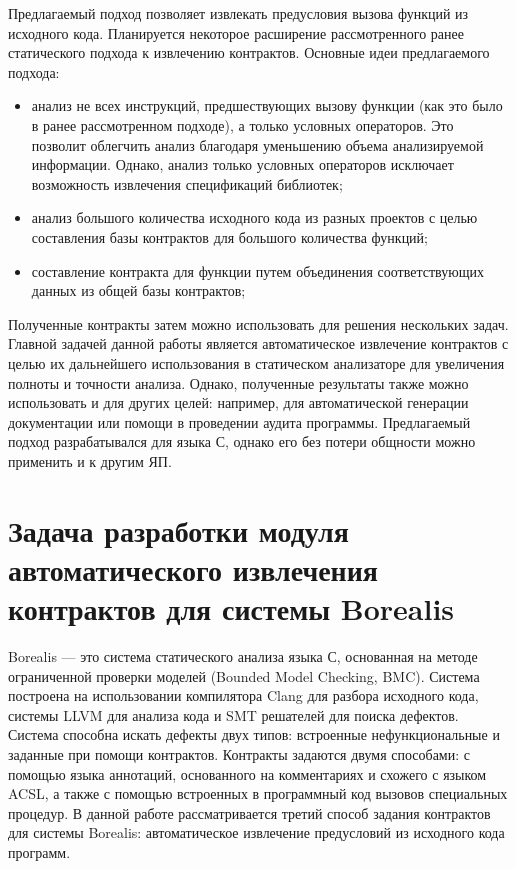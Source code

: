 Предлагаемый подход позволяет извлекать предусловия вызова функций из исходного кода. Планируется некоторое расширение рассмотренного ранее статического подхода к извлечению контрактов\cite{staticPredicateMining}. Основные идеи предлагаемого подхода:
\begin{itemize}
\item анализ не всех инструкций, предшествующих вызову функции (как это было в ранее рассмотренном подходе), а только условных операторов. Это позволит облегчить анализ благодаря уменьшению объема анализируемой информации. Однако, анализ только условных операторов исключает возможность извлечения спецификаций библиотек;
\item анализ большого количества исходного кода из разных проектов с целью составления базы контрактов для большого количества функций;
\item составление контракта для функции путем объединения соответствующих данных из общей базы контрактов;
\end{itemize}

Полученные контракты затем можно использовать для решения нескольких задач. Главной задачей данной работы является автоматическое извлечение контрактов с целью их дальнейшего использования в статическом анализаторе для увеличения полноты и точности анализа. Однако, полученные результаты также можно использовать и для других целей: например, для автоматической генерации документации или помощи в проведении аудита программы. Предлагаемый подход разрабатывался для языка С, однако его без потери общности можно применить и к другим ЯП.

\section{Задача разработки модуля автоматического извлечения контрактов для системы Borealis}
Borealis --- это система статического анализа языка С, основанная на методе ограниченной проверки моделей (Bounded Model Checking, BMC)\cite{bmc}. Система построена на использовании компилятора Clang\cite{clang} для разбора исходного кода, системы LLVM\cite{llvm} для анализа кода и SMT решателей для поиска дефектов. Система способна искать дефекты двух типов: встроенные нефункциональные и заданные при помощи контрактов. Контракты задаются двумя способами: с помощью языка аннотаций, основанного на комментариях и схожего с языком ACSL, а также с помощью встроенных в программный код вызовов специальных процедур. В данной работе рассматривается третий способ задания контрактов для системы Borealis: автоматическое извлечение предусловий из исходного кода программ.

